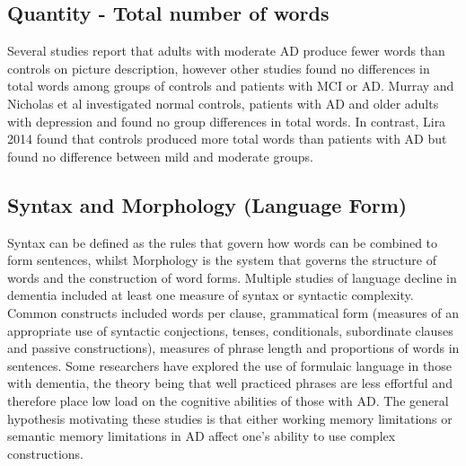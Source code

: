 \documentclass[12pt]{article}
\begin{document}
\subsection{Quantity - Total number of words}
Several studies report that adults with moderate AD produce fewer words than controls on picture description, however other studies found no differences in total words among groups of controls and patients with MCI or AD. Murray and Nicholas et al investigated normal controls, patients with AD and older adults with depression and found no group differences in total words. In contrast, Lira 2014 found that controls produced more total words than patients with AD but found no difference between mild and moderate groups. \newline
\par
\subsection{Syntax and Morphology (Language Form)}
Syntax can be defined as the rules that govern how words can be combined to form sentences, whilst Morphology is the system that governs the structure of words and the construction of word forms. Multiple studies of language decline in dementia included at least one measure of syntax or syntactic complexity. Common constructs included words per clause, grammatical form (measures of an appropriate use of syntactic conjections, tenses, conditionals, subordinate clauses and passive constructions), measures of phrase length and proportions of words in sentences. Some researchers have explored the use of formulaic language in those with dementia, the theory being that well practiced phrases are less effortful and therefore place low load on the cognitive abilities of those with AD. The general hypothesis motivating these studies is that either working memory limitations or semantic memory limitations in AD affect one's ability to use complex constructions. \newline
\par
\end{document}
